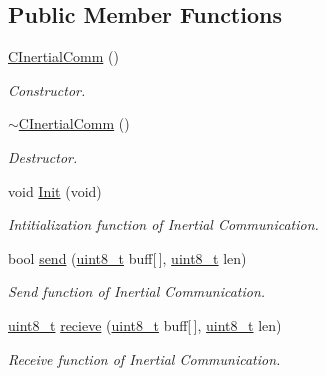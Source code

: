 \subsection*{Public Member Functions}
\begin{DoxyCompactItemize}
\item 
\mbox{\hyperlink{class_c_inertial_comm_a86917a157b0acfa80c9f178f18d882fc}{C\+Inertial\+Comm}} ()
\begin{DoxyCompactList}\small\item\em Constructor. \end{DoxyCompactList}\item 
\mbox{\hyperlink{class_c_inertial_comm_a7673549eec2f597714a39b2c4f5ab3ae}{$\sim$\+C\+Inertial\+Comm}} ()
\begin{DoxyCompactList}\small\item\em Destructor. \end{DoxyCompactList}\item 
void \mbox{\hyperlink{class_c_inertial_comm_aa8c4c1dc4ca32817bb51c520c052b4c3}{Init}} (void)
\begin{DoxyCompactList}\small\item\em Intitialization function of Inertial Communication. \end{DoxyCompactList}\item 
bool \mbox{\hyperlink{class_c_inertial_comm_ad40aa8ed083373c27fdc1aa11dfc319e}{send}} (\mbox{\hyperlink{_a_d_a_s___types_8h_aba7bc1797add20fe3efdf37ced1182c5}{uint8\+\_\+t}} buff\mbox{[}$\,$\mbox{]}, \mbox{\hyperlink{_a_d_a_s___types_8h_aba7bc1797add20fe3efdf37ced1182c5}{uint8\+\_\+t}} len)
\begin{DoxyCompactList}\small\item\em Send function of Inertial Communication. \end{DoxyCompactList}\item 
\mbox{\hyperlink{_a_d_a_s___types_8h_aba7bc1797add20fe3efdf37ced1182c5}{uint8\+\_\+t}} \mbox{\hyperlink{class_c_inertial_comm_abaed54099a0192df5a9318dc99de3668}{recieve}} (\mbox{\hyperlink{_a_d_a_s___types_8h_aba7bc1797add20fe3efdf37ced1182c5}{uint8\+\_\+t}} buff\mbox{[}$\,$\mbox{]}, \mbox{\hyperlink{_a_d_a_s___types_8h_aba7bc1797add20fe3efdf37ced1182c5}{uint8\+\_\+t}} len)
\begin{DoxyCompactList}\small\item\em Receive function of Inertial Communication. \end{DoxyCompactList}\end{DoxyCompactItemize}


